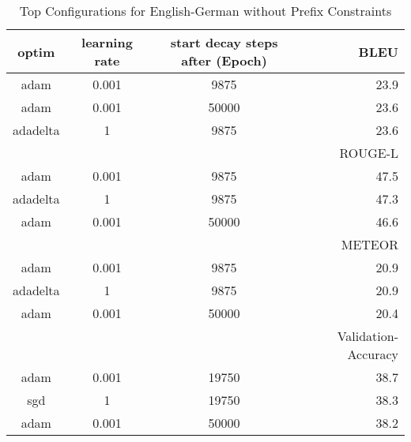 \begin{table}
	\caption{Top Configurations for English-German without Prefix Constraints}
	\label{tab:optim_clean-de-en}
	\centering
\begin{tabular}{|c|c|c|r|}
	\hline
	optim   & learning rate & start decay steps after (Epoch)  & BLEU\\
	\hline
	  adam  &     0.001    &        9875      & 23.9 \\
	  adam  &     0.001    &       50000      & 23.6 \\
	adadelta&       1      &        9875      & 23.6 \\
	\hline
	\hline
	& & & ROUGE-L \\
	\hline
	adam  &     0.001    &        9875      & 47.5 \\
	adadelta&       1    &        9875      & 47.3 \\
	adam  &     0.001    &       50000      & 46.6 \\
	\hline
	\hline
	& & & METEOR \\
	\hline
	  adam  &     0.001    &        9875      & 20.9 \\
	adadelta&       1      &        9875      & 20.9 \\
	  adam  &     0.001    &       50000      & 20.4 \\
	\hline
	\hline
	& & & Validation-Accuracy \\
	\hline
	  adam  &     0.001    &       19750      & 38.7 \\
	  sgd   &       1      &       19750      & 38.3 \\
	  adam  &     0.001    &       50000      & 38.2 \\
	\hline
\end{tabular}
\end{table}
